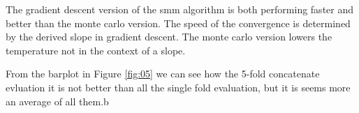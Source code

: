 \documentclass{bioinfo}
\begin{document}
\begin{application}
\par The gradient descent version of the smm algorithm is both performing faster and better than the monte carlo version. The speed of the convergence is determined by the derived slope in gradient descent. The monte carlo version lowers the temperature not in the context of a slope.
\par From the barplot in Figure \ref{fig:05} we can see how the 5-fold concatenate evluation it is not better than all the single fold evaluation, but it is seems more an average of all them.b











%
%
%
%
%






\end{application}
\end{document}
